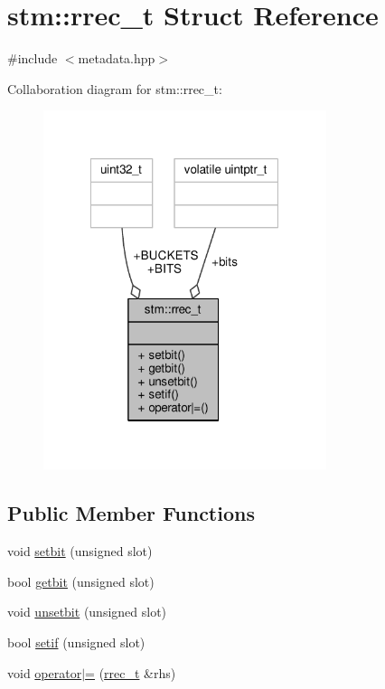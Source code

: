 \hypertarget{structstm_1_1rrec__t}{\section{stm\-:\-:rrec\-\_\-t Struct Reference}
\label{structstm_1_1rrec__t}
}


{\ttfamily \#include $<$metadata.\-hpp$>$}



Collaboration diagram for stm\-:\-:rrec\-\_\-t\-:
\nopagebreak
\begin{figure}[H]
\begin{center}
\leavevmode
\includegraphics[width=235pt]{structstm_1_1rrec__t__coll__graph}
\end{center}
\end{figure}
\subsection*{Public Member Functions}
\begin{DoxyCompactItemize}
\item 
void \hyperlink{structstm_1_1rrec__t_a8e7d6e312fea1d8b9751cccdbe600d47}{setbit} (unsigned slot)
\item 
bool \hyperlink{structstm_1_1rrec__t_afbaca6e3efffa2859ffe5d96bee429d2}{getbit} (unsigned slot)
\item 
void \hyperlink{structstm_1_1rrec__t_a7c05a4f78bd7e11e635274cacdfa4255}{unsetbit} (unsigned slot)
\item 
bool \hyperlink{structstm_1_1rrec__t_a6905a591f9bdd8ae5353da3e488d3afc}{setif} (unsigned slot)
\item 
void \hyperlink{structstm_1_1rrec__t_a35d775831a537137bae5ca50dcb4043e}{operator$\vert$=} (\hyperlink{structstm_1_1rrec__t}{rrec\-\_\-t} \&rhs)
\end{DoxyCompactItemize}

